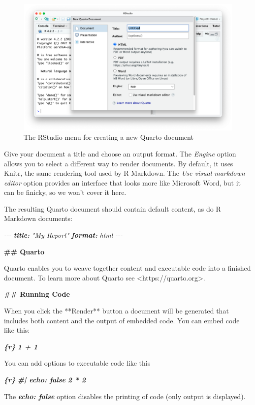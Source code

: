 \documentclass[
]{book}
\newenvironment{Shaded}{\begin{snugshade}}{\end{snugshade}}
\newcommand{\AnnotationTok}[1]{\textcolor[rgb]{0.56,0.35,0.01}{\textbf{\textit{#1}}}}
\newcommand{\CommentTok}[1]{\textcolor[rgb]{0.56,0.35,0.01}{\textit{#1}}}
\newcommand{\FunctionTok}[1]{\textcolor[rgb]{0.13,0.29,0.53}{\textbf{#1}}}
\newcommand{\InformationTok}[1]{\textcolor[rgb]{0.56,0.35,0.01}{\textbf{\textit{#1}}}}
\newcommand{\NormalTok}[1]{#1}
\newcommand{\OtherTok}[1]{\textcolor[rgb]{0.56,0.35,0.01}{#1}}
\begin{document}
\begin{figure}
\includegraphics[width=1\linewidth]{assets/new-quarto-doc} \caption{The RStudio menu for creating a new Quarto document}\label{fig:new-quarto-doc}
\end{figure}

Give your document a title and choose an output format. The \emph{Engine} option allows you to select a different way to render documents. By default, it uses Knitr, the same rendering tool used by R Markdown. The \emph{Use visual markdown editor} option provides an interface that looks more like Microsoft Word, but it can be finicky, so we won't cover it here.

The resulting Quarto document should contain default content, as do R Markdown documents:

\begin{Shaded}
\begin{Highlighting}[]
\CommentTok{{-}{-}{-}}
\AnnotationTok{title:}\CommentTok{ "My Report"}
\AnnotationTok{format:}\CommentTok{ html}
\CommentTok{{-}{-}{-}}

\FunctionTok{\#\# Quarto}

\NormalTok{Quarto enables you to weave together content and executable code into a finished document. To learn more about Quarto see }\OtherTok{\textless{}https://quarto.org\textgreater{}}\NormalTok{.}

\FunctionTok{\#\# Running Code}

\NormalTok{When you click the **Render** button a document will be generated that includes both content and the output of embedded code. You can embed code like this:}

\InformationTok{\textasciigrave{}\textasciigrave{}\textasciigrave{}\{r\}}
\InformationTok{1 + 1}
\InformationTok{\textasciigrave{}\textasciigrave{}\textasciigrave{}}

\NormalTok{You can add options to executable code like this }

\InformationTok{\textasciigrave{}\textasciigrave{}\textasciigrave{}\{r\}}
\InformationTok{\#| echo: false}
\InformationTok{2 * 2}
\InformationTok{\textasciigrave{}\textasciigrave{}\textasciigrave{}}

\NormalTok{The }\InformationTok{\textasciigrave{}echo: false\textasciigrave{}}\NormalTok{ option disables the printing of code (only output is displayed).}
\end{Highlighting}
\end{Shaded}
\end{document}
